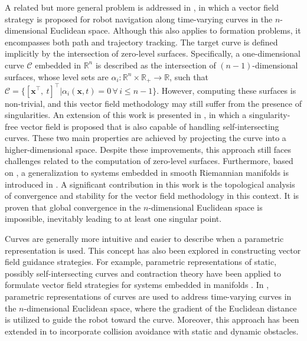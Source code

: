 A related but more general problem is addressed in \citet{goncalves2010vectorfield}, in which a vector field strategy is proposed for robot navigation along time-varying curves in the $n$-dimensional Euclidean space. Although this also applies to formation problems, it encompasses both path and trajectory tracking. The target curve is defined implicitly by the intersection of zero-level surfaces. Specifically, a one-dimensional curve $\mathcal{C}$ embedded in $\mathbb{R}^n$ is described as the intersection of $(n-1)$-dimensional surfaces, whose level sets are $\alpha_i:\mathbb{R}^n\times\mathbb{R}_+\to\mathbb{R}$, such that $\mathcal{C} = \{ [ \mathbf{x}^\top,\ t]^\top | \alpha_i(\mathbf{x}, t) = 0\,\forall\,i\le n-1 \}$. However, computing these surfaces is non-trivial, and this vector field methodology may still suffer from the presence of singularities. An extension of this work is presented in \citet{yao2021singularity}, in which a singularity-free vector field is proposed that is also capable of handling self-intersecting curves. These two main properties are achieved by projecting the curve into a higher-dimensional space. Despite these improvements, this approach still faces challenges related to the computation of zero-level surfaces. Furthermore, based on \citet{goncalves2010vectorfield}, a generalization to systems embedded in smooth Riemannian manifolds is introduced in \citet{yao2022topological}. A significant contribution in this work is the topological analysis of convergence and stability for the vector field methodology in this context. It is proven that global convergence in the $n$-dimensional Euclidean space is impossible, inevitably leading to at least one singular point.

Curves are generally more intuitive and easier to describe when a parametric representation is used. This concept has also been explored in constructing vector field guidance strategies. For example, parametric representations of static, possibly self-intersecting curves and contraction theory have been applied to formulate vector field strategies for systems embedded in manifolds \citep{Wu2018}. In \citet{Rezende2022}, parametric representations of curves are used to address time-varying curves in the $n$-dimensional Euclidean space, where the gradient of the Euclidean distance is utilized to guide the robot toward the curve. Moreover, this approach has been extended in \citet{Nunes2022} to incorporate collision avoidance with static and dynamic obstacles.

